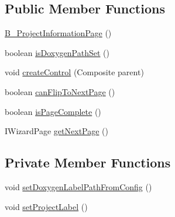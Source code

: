 \subsection*{Public Member Functions}
\begin{DoxyCompactItemize}
\item 
\hyperlink{classit_1_1isislab_1_1masonassisteddocumentation_1_1mason_1_1wizards_1_1_b___project_information_page_a2e67ccd1816ffe847ad99b57bc6bfdad}{B\-\_\-\-Project\-Information\-Page} ()
\item 
boolean \hyperlink{classit_1_1isislab_1_1masonassisteddocumentation_1_1mason_1_1wizards_1_1_b___project_information_page_a5b4f818a204c8f8a1934ceaf016cabd7}{is\-Doxygen\-Path\-Set} ()
\item 
void \hyperlink{classit_1_1isislab_1_1masonassisteddocumentation_1_1mason_1_1wizards_1_1_b___project_information_page_ab664591c88285aa5d3cc990620e812dd}{create\-Control} (Composite parent)
\item 
boolean \hyperlink{classit_1_1isislab_1_1masonassisteddocumentation_1_1mason_1_1wizards_1_1_b___project_information_page_a4ad2c0b1269d22b81ffc9e77f399c6af}{can\-Flip\-To\-Next\-Page} ()
\item 
boolean \hyperlink{classit_1_1isislab_1_1masonassisteddocumentation_1_1mason_1_1wizards_1_1_b___project_information_page_a86f79621a6b3201e70a35c54ec1e8c3f}{is\-Page\-Complete} ()
\item 
I\-Wizard\-Page \hyperlink{classit_1_1isislab_1_1masonassisteddocumentation_1_1mason_1_1wizards_1_1_b___project_information_page_a62abef1230b2c72e555e530004e4c5f9}{get\-Next\-Page} ()
\end{DoxyCompactItemize}
\subsection*{Private Member Functions}
\begin{DoxyCompactItemize}
\item 
void \hyperlink{classit_1_1isislab_1_1masonassisteddocumentation_1_1mason_1_1wizards_1_1_b___project_information_page_ad0acda6e90aee0af403c3e9c53525b5d}{set\-Doxygen\-Label\-Path\-From\-Config} ()
\item 
void \hyperlink{classit_1_1isislab_1_1masonassisteddocumentation_1_1mason_1_1wizards_1_1_b___project_information_page_af5afa21c1d0087572ad8b3d0a1a1fe9c}{set\-Project\-Label} ()
\end{DoxyCompactItemize}
